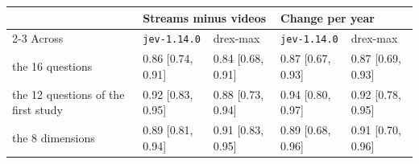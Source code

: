 {\footnotesize
\begin{tabular}{@{}l l l l l@{}}
\toprule
 & \multicolumn{2}{l}{Streams minus videos} & \multicolumn{2}{l}{Change per year} \\
\cmidrule(r){2-3}\cmidrule{4-5}
Across & \texttt{jev-1.14.0} & drex-max & \texttt{jev-1.14.0} & drex-max \\
\midrule
the 16 questions & 0.86 {\scriptsize[0.74, 0.91]} & 0.84 {\scriptsize[0.68, 0.91]} & 0.87 {\scriptsize[0.67, 0.93]} & 0.87 {\scriptsize[0.69, 0.93]} \\
the 12 questions of the first study & 0.92 {\scriptsize[0.83, 0.95]} & 0.88 {\scriptsize[0.73, 0.94]} & 0.94 {\scriptsize[0.80, 0.97]} & 0.92 {\scriptsize[0.78, 0.95]} \\
the 8 dimensions & 0.89 {\scriptsize[0.81, 0.94]} & 0.91 {\scriptsize[0.83, 0.95]} & 0.89 {\scriptsize[0.68, 0.96]} & 0.91 {\scriptsize[0.70, 0.96]} \\
\bottomrule
\end{tabular}}
